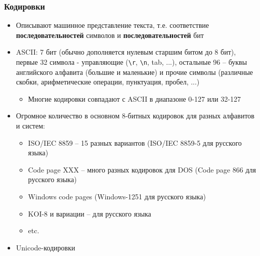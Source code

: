 \documentclass{beamer}
\begin{document}
\begin{frame}[fragile]
\frametitle{Кодировки}
\fontsize{10pt}{10pt}
\begin{itemize}
\item Описывают машинное представление текста, т.е. соответствие \textbf{последовательностей} символов и \textbf{последовательностей} бит
\pause
\item ASCII: 7 бит (обычно дополняется нулевым старшим битом до 8 бит), первые 32 символа - управляющие (\verb|\r|, \verb|\n|, tab, ...), остальные 96 -- буквы английского алфавита (большие и маленькие) и прочие символы (различные скобки, арифметические операции, пунктуация, пробел, ...)
\pause
\begin{itemize}
\item Многие кодировки совпадают с ASCII в диапазоне 0-127 или 32-127
\end{itemize}
\pause
\item Огромное количество в основном 8-битных кодировок для разных алфавитов и систем:
\begin{itemize}
\item ISO/IEC 8859 -- 15 разных вариантов (ISO/IEC 8859-5 для русского языка)
\item Code page XXX -- много разных кодировок для DOS (Code page 866 для русского языка)
\item Windows code pages (Windows-1251 для русского языка)
\item KOI-8 и вариации -- для русского языка
\item etc.
\end{itemize}
\pause
\item Unicode-кодировки
\end{itemize}
\end{frame}
\end{document}
